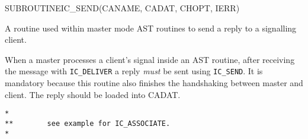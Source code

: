 \begin{routine} %
\subroutine
   {SUBROUTINE}{IC\_SEND}{(CANAME, CADAT, CHOPT, IERR)}
\begin{overview}
A routine used within \mailbox master mode AST routines to send a
reply to a signalling client.

\end{overview}
\begin{argdeflist}
\end{argdeflist}
\begin{describe}

When a \mailbox master processes a client's signal inside an AST routine,
after receiving the message with \verb|IC_DELIVER|  a reply {\em must}
be sent using \verb|IC_SEND|. It is mandatory because this routine also
finishes the handshaking between master and client. The reply should
be loaded into CADAT.

\end{describe}
\begin{options}
\end{options}
\begin{returncodes}
\end{returncodes}
\begin{examplecode}\begin{verbatim}
*
**        see example for IC_ASSOCIATE.
*
\end{verbatim}\end{examplecode}
\end{routine}


